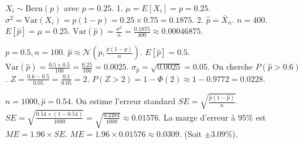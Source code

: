 \begin{correctionbox}
$X_i \sim \text{Bern}(p)$ avec $p=0.25$.
1.  $\mu = E[X_i] = p = 0.25$.
    $\sigma^2 = \text{Var}(X_i) = p(1-p) = 0.25 \times 0.75 = 0.1875$.
2.  $\hat{p} = \bar{X}_n$. $n=400$.
    $E[\hat{p}] = \mu = 0.25$.
    $\text{Var}(\hat{p}) = \frac{\sigma^2}{n} = \frac{0.1875}{400} \approx 0.00046875$.
\end{correctionbox}

\begin{correctionbox}
$p=0.5, n=100$. $\hat{p} \approx \mathcal{N}(p, \frac{p(1-p)}{n})$.
$E[\hat{p}] = 0.5$.
$\text{Var}(\hat{p}) = \frac{0.5 \times 0.5}{100} = \frac{0.25}{100} = 0.0025$.
$\sigma_{\hat{p}} = \sqrt{0.0025} = 0.05$.
On cherche $P(\hat{p} > 0.6)$.
$Z = \frac{0.6 - 0.5}{0.05} = \frac{0.1}{0.05} = 2$.
$P(Z > 2) = 1 - \Phi(2) \approx 1 - 0.9772 = 0.0228$.
\end{correctionbox}

\begin{correctionbox}
$n=1000, \hat{p}=0.54$.
On estime l'erreur standard $SE = \sqrt{\frac{\hat{p}(1-\hat{p})}{n}}$.
$SE = \sqrt{\frac{0.54 \times (1 - 0.54)}{1000}} = \sqrt{\frac{0.2484}{1000}} \approx 0.01576$.
La marge d'erreur à 95\% est $ME = 1.96 \times SE$.
$ME = 1.96 \times 0.01576 \approx 0.0309$.
(Soit $\pm 3.09\%$).
\end{correctionbox}
